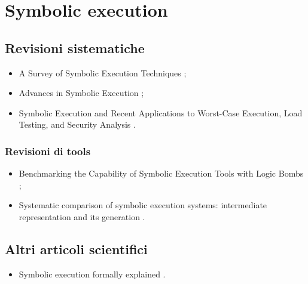 \section*{Symbolic execution}

\subsection*{Revisioni sistematiche}
\begin{itemize}

\item A Survey of Symbolic Execution Techniques \cite{baldoni2018symbexereview};

\item Advances in Symbolic Execution \cite{yang2019symbexereview};

\item Symbolic Execution and Recent Applications to Worst-Case Execution, Load Testing, and Security Analysis \cite{pasareanu2019symbexereview}.

\end{itemize}

\subsubsection*{Revisioni di tools}
\begin{itemize}

\item Benchmarking the Capability of Symbolic Execution Tools with Logic Bombs \cite{xu2020symbexetools};

\item Systematic comparison of symbolic execution systems: intermediate representation and its generation \cite{poeplau2019symbexetools}.

\end{itemize}

\subsection*{Altri articoli scientifici}
\begin{itemize}

\item Symbolic execution formally explained \cite{boer2021symbexe}.

\end{itemize}

